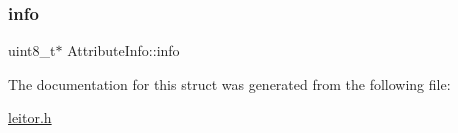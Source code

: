 \mbox{\label{structAttributeInfo_a29031abd0ae7fd3a55950616e5368dd2}} 
\subsubsection{\texorpdfstring{info}{info}}
{\footnotesize\ttfamily uint8\+\_\+t$\ast$ Attribute\+Info\+::info}



The documentation for this struct was generated from the following file\+:\begin{DoxyCompactItemize}
\item 
\hyperlink{leitor_8h}{leitor.\+h}\end{DoxyCompactItemize}
